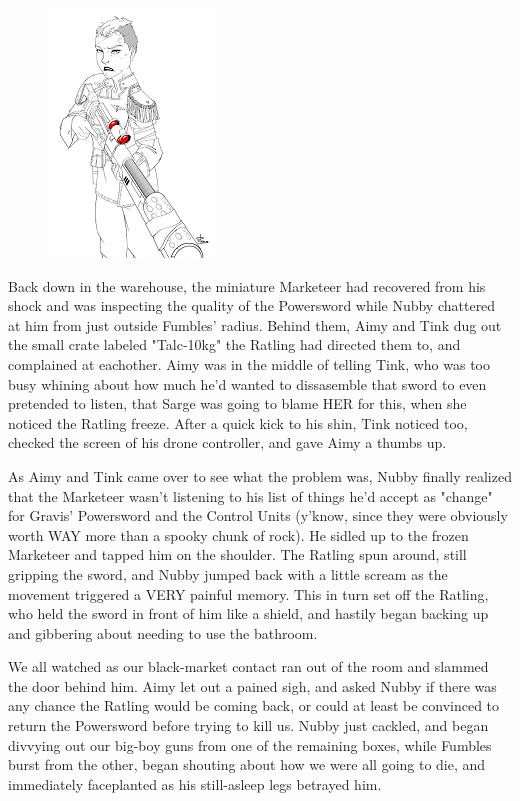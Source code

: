 \begin{figure}
	\begin{center}
		\includegraphics[width=\figwidth]{pics/14/22.png}
	\end{center}
\end{figure}
Back down in the warehouse, the miniature Marketeer had recovered from his shock and was inspecting the quality of the Powersword while Nubby chattered at him from just outside Fumbles' radius. 
Behind them, Aimy and Tink dug out the small crate labeled "Talc-10kg" the Ratling had directed them to, and complained at eachother. 
Aimy was in the middle of telling Tink, who was too busy whining about how much he'd wanted to dissasemble that sword to even pretended to listen, that Sarge was going to blame HER for this, when she noticed the Ratling freeze. 
After a quick kick to his shin, Tink noticed too, checked the screen of his drone controller, and gave Aimy a thumbs up. 


As Aimy and Tink came over to see what the problem was, Nubby finally realized that the Marketeer wasn't listening to his list of things he'd accept as "change" for Gravis' Powersword and the Control Units (y'know, since they were obviously worth WAY more than a spooky chunk of rock). 
He sidled up to the frozen Marketeer and tapped him on the shoulder. 
The Ratling spun around, still gripping the sword, and Nubby jumped back with a little scream as the movement triggered a VERY painful memory. 
This in turn set off the Ratling, who held the sword in front of him like a shield, and hastily began backing up and gibbering about needing to use the bathroom.

We all watched as our black-market contact ran out of the room and slammed the door behind him. 
Aimy let out a pained sigh, and asked Nubby if there was any chance the Ratling would be coming back, or could at least be convinced to return the Powersword before trying to kill us. 
Nubby just cackled, and began divvying out our big-boy guns from one of the remaining boxes, while Fumbles burst from the other, began shouting about how we were all going to die, and immediately faceplanted as his still-asleep legs betrayed him. 


